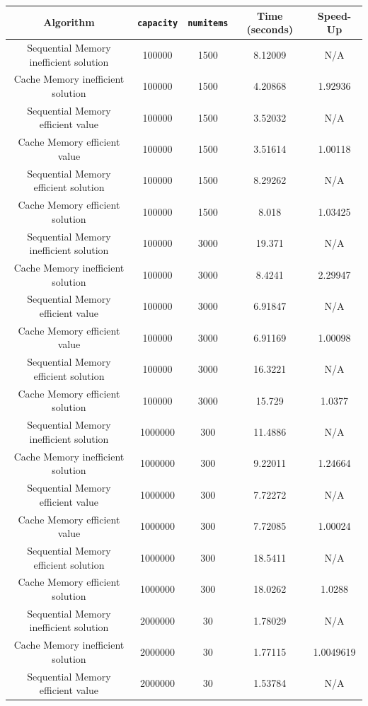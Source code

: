 \documentclass[10pt]{article}
\begin{document}
\begin{enumerate}
 \begin{table}[h!]
 \begin{center}
 \begin{tabular}{|c|c|c|c|c|}
 \hline
 Algorithm & \texttt{capacity} & \texttt{numitems} & Time (seconds) & Speed-Up\\
 \hline
 Sequential Memory inefficient solution & 100000 & 1500 & 8.12009 & N/A \\ 
 Cache Memory inefficient solution & 100000 & 1500 & 4.20868 & 1.92936\\
 Sequential Memory efficient value & 100000 & 1500 & 3.52032 & N/A \\
 Cache Memory efficient value & 100000 & 1500 & 3.51614 & 1.00118  \\
 Sequential Memory efficient solution & 100000 & 1500 & 8.29262 & N/A \\
 Cache Memory efficient solution & 100000 & 1500 & 8.018 & 1.03425 \\
 \hline
 Sequential Memory inefficient solution & 100000 & 3000 & 19.371 & N/A \\ 
 Cache Memory inefficient solution & 100000 & 3000 & 8.4241 & 2.29947\\
 Sequential Memory efficient value & 100000 & 3000 & 6.91847 & N/A \\
 Cache Memory efficient value & 100000 & 3000 & 6.91169 & 1.00098  \\
 Sequential Memory efficient solution & 100000 & 3000 & 16.3221 & N/A \\
 Cache Memory efficient solution & 100000 & 3000 & 15.729 & 1.0377 \\
 \hline
 Sequential Memory inefficient solution & 1000000 & 300 & 11.4886 & N/A \\ 
 Cache Memory inefficient solution & 1000000 & 300 & 9.22011 & 1.24664\\
 Sequential Memory efficient value & 1000000 & 300 & 7.72272 & N/A \\
 Cache Memory efficient value & 1000000 & 300 & 7.72085 & 1.00024  \\
 Sequential Memory efficient solution & 1000000 & 300 & 18.5411 & N/A \\
 Cache Memory efficient solution & 1000000 & 300 & 18.0262 & 1.0288 \\
 \hline
  Sequential Memory inefficient solution & 2000000 & 30 & 1.78029 & N/A \\ 
 Cache Memory inefficient solution & 2000000 & 30 & 1.77115 & 1.0049619\\
 Sequential Memory efficient value & 2000000 & 30 & 1.53784 & N/A \\

\end{tabular}
\end{center}
\end{table}
\end{enumerate}
\end{document}
